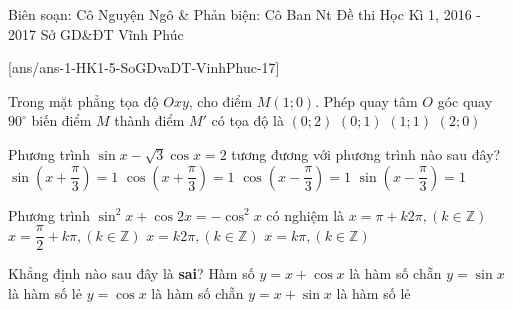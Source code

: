 \begin{name}
{Biên soạn: Cô Nguyện Ngô \& Phản biện: Cô Ban Nt}
		{Đề thi Học Kì 1, 2016 - 2017 Sở GD\&ĐT Vĩnh Phúc}
	\end{name}
\setcounter{ex}{0}
[ans/ans-1-HK1-5-SoGDvaDT-VinhPhuc-17]

\begin{ex}%
 Trong mặt phẳng tọa độ $Oxy$, cho điểm $M(1;0)$. Phép quay tâm $O$ góc quay $90^\circ$ biến điểm $M$ thành điểm $M'$ có tọa độ là
\choice
{$(0;2)$}
{\True $(0;1)$}
{$(1;1)$}
{$(2;0)$}
\end{ex}

\begin{ex}%
Phương trình $\sin x-\sqrt3\cos x=2$ tương đương với phương trình nào sau đây?
\choice
{$\sin\left(x+\dfrac{\pi}{3}\right)=1$}
{$\cos\left(x+\dfrac{\pi}{3}\right)=1$}
{$\cos\left(x-\dfrac{\pi}{3}\right)=1$}
{\True $\sin\left(x-\dfrac{\pi}{3}\right)=1$}
\end{ex}

\begin{ex}%
Phương trình $\sin^2 x+\cos 2x=-\cos^2 x$ có nghiệm là
\choice
{$x=\pi+k2\pi, (k\in \mathbb{Z})$}
{\True $x=\dfrac{\pi}{2}+k\pi, (k\in \mathbb{Z})$}
{$x=k2\pi, (k\in \mathbb{Z})$}
{$x=k\pi, (k\in \mathbb{Z})$}
\end{ex}

\begin{ex}%
Khẳng định nào sau đây là \textbf{sai}?
\choice
{\True Hàm số $y=x+\cos x$ là hàm số chẵn}
{$y=\sin x$ là hàm số lẻ}
{$y=\cos x$ là hàm số chẵn}
{$y=x+\sin x$ là hàm số lẻ}
\end{ex}

